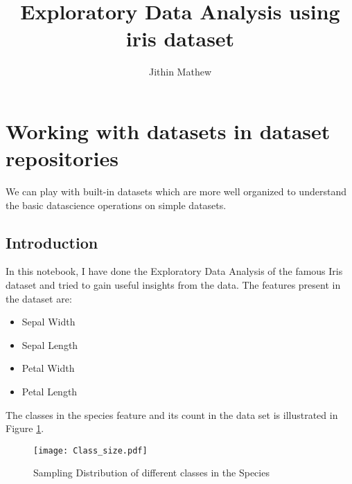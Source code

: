 \documentclass{article}
\title{Exploratory Data Analysis using iris dataset}
\author{Jithin Mathew}
\date{}
\begin{document}
\maketitle
\tableofcontents
\listoffigures
\newpage
\section{Working with datasets in dataset repositories}

We can play with built-in datasets which are more well organized to understand the basic datascience operations on simple datasets.
\subsection{Introduction}
In this notebook, I have done the Exploratory Data Analysis of the famous Iris dataset and tried to gain useful insights from the data. The features present in the dataset are:
\begin{itemize}
\item Sepal Width
\item Sepal Length
\item Petal Width
\item Petal Length
\end{itemize}
The classes in the species feature and its count in the data set is illustrated in Figure \ref{fig:class_size}.
\begin{figure}[h]
    \centering
    \texttt{[image: Class\_size.pdf]}
    \caption{Sampling Distribution of different classes in the Species}
    \label{fig:class_size}
\end{figure}
\end{document}

